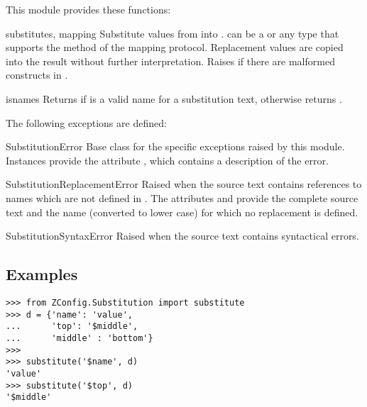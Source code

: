 \documentclass{howto}
\begin{document}
This module provides these functions:

\begin{funcdesc}{substitute}{s, mapping}
  Substitute values from  into .  
  can be a  or any type that supports the 
  method of the mapping protocol.  Replacement
  values are copied into the result without further interpretation.
  Raises  if there are malformed
  constructs in .
\end{funcdesc}

\begin{funcdesc}{isname}{s}
  Returns  if  is a valid name for a substitution
  text, otherwise returns .
\end{funcdesc}

The following exceptions are defined:

\begin{excdesc}{SubstitutionError}
  Base class for the specific exceptions raised by this module.
  Instances provide the attribute , which contains a
  description of the error.
\end{excdesc}

\begin{excdesc}{SubstitutionReplacementError}
  Raised when the source text contains references to names which are
  not defined in .  The attributes  and
   provide the complete source text and the name
  (converted to lower case) for which no replacement is defined.
\end{excdesc}

\begin{excdesc}{SubstitutionSyntaxError}
  Raised when the source text contains syntactical errors.
\end{excdesc}


\subsection{Examples}

\begin{verbatim}
>>> from ZConfig.Substitution import substitute
>>> d = {'name': 'value',
...      'top': '$middle',
...      'middle' : 'bottom'}
>>>
>>> substitute('$name', d)
'value'
>>> substitute('$top', d)
'$middle'
\end{verbatim}
\end{document}
